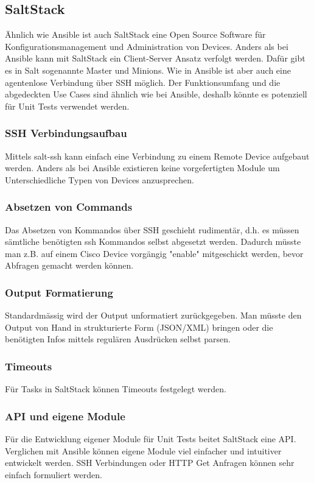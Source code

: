 \documentclass[a4,12pt]{scrartcl}
\begin{document}
\subsection{SaltStack}
Ähnlich wie Ansible ist auch SaltStack eine Open Source Software für Konfigurationsmanagement und Administration von Devices. Anders als bei Ansible kann mit SaltStack ein Client-Server Ansatz verfolgt werden. Dafür gibt es in Salt sogenannte Master und Minions. Wie in Ansible ist aber auch eine agentenlose Verbindung über SSH möglich. Der Funktionsumfang und die abgedeckten Use Cases sind ähnlich wie bei Ansible, deshalb könnte es potenziell für Unit Tests verwendet werden.
\subsubsection{SSH Verbindungsaufbau}
Mittels salt-ssh kann einfach eine Verbindung zu einem Remote Device aufgebaut werden. Anders als bei Ansible existieren keine vorgefertigten Module um Unterschiedliche Typen von Devices anzusprechen. 
\subsubsection{Absetzen von Commands}
Das Absetzen von Kommandos über SSH geschieht rudimentär, d.h. es müssen sämtliche benötigten ssh Kommandos selbst abgesetzt werden. Dadurch müsste man z.B. auf einem Cisco Device vorgängig "enable" mitgeschickt werden, bevor Abfragen gemacht werden können.
\subsubsection{Output Formatierung}
Standardmässig wird der Output unformatiert zurückgegeben. Man müsste den Output von Hand in strukturierte Form (JSON/XML) bringen oder die benötigten Infos mittels regulären Ausdrücken selbst parsen.
\subsubsection{Timeouts}
Für Tasks in SaltStack können Timeouts festgelegt werden.
\subsubsection{API und eigene Module}
Für die Entwicklung eigener Module für Unit Tests beitet SaltStack eine API. Verglichen mit Ansible können eigene Module viel einfacher und intuitiver entwickelt werden. SSH Verbindungen oder HTTP Get Anfragen können sehr einfach formuliert werden.
\end{document}
